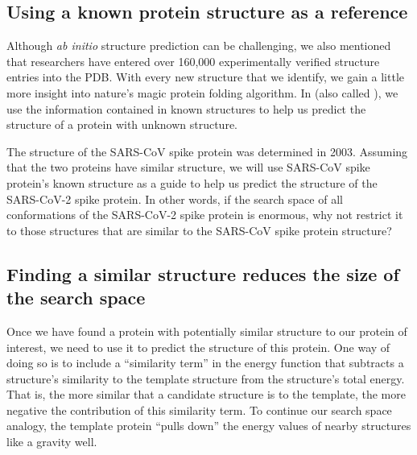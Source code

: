 \subsection{Using a known protein structure as a reference}

Although \textit{ab initio} structure prediction can be challenging, we also mentioned that researchers have entered over 160,000 experimentally verified structure entries into the PDB. With every new structure that we identify, we gain a little more insight into nature's magic protein folding algorithm. In  (also called ), we use the information contained in known structures to help us predict the structure of a protein with unknown structure.

The structure of the SARS-CoV spike protein was determined in 2003. Assuming that the two proteins have similar structure, we will use SARS-CoV spike protein's known structure as a guide to help us predict the structure of the SARS-CoV-2 spike protein. In other words, if the search space of all conformations of the SARS-CoV-2 spike protein is enormous, why not restrict it to those structures that are similar to the SARS-CoV spike protein structure?\\

\begin{qbox}\end{qbox}

\subsection{Finding a similar structure reduces the size of the search space}

Once we have found a protein with potentially similar structure to our protein of interest, we need to use it to predict the structure of this protein. One way of doing so is to include a ``similarity term'' in the energy function that subtracts a structure's similarity to the template structure from the structure's total energy. That is, the more similar that a candidate structure is to the template, the more negative the contribution of this similarity term. To continue our search space analogy, the template protein ``pulls down'' the energy values of nearby structures like a gravity well.

